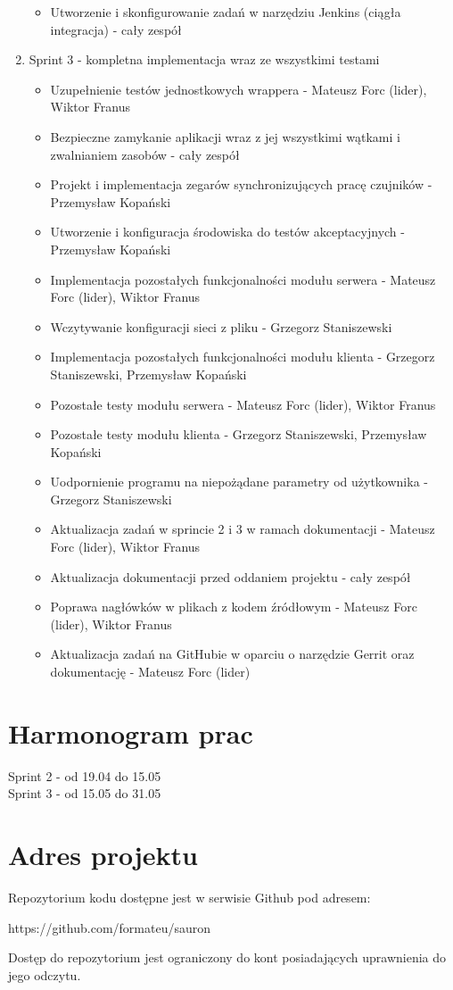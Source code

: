 \documentclass[a4paper,11pt]{article}
\begin{document}
\begin{enumerate}
\begin{itemize}
\item Utworzenie i skonfigurowanie zadań w narzędziu Jenkins (ciągła integracja) - cały zespół
\end{itemize}
\item Sprint 3 - kompletna implementacja wraz ze wszystkimi testami
\begin{itemize}
\item Uzupełnienie testów jednostkowych wrappera - Mateusz Forc (lider), Wiktor Franus
\item Bezpieczne zamykanie aplikacji wraz z jej wszystkimi wątkami i zwalnianiem zasobów - cały zespół
\item Projekt i implementacja zegarów synchronizujących pracę czujników - Przemysław Kopański
\item Utworzenie i konfiguracja środowiska do testów akceptacyjnych - Przemysław Kopański
\item Implementacja pozostałych funkcjonalności modułu serwera - Mateusz Forc (lider), Wiktor Franus
\item Wczytywanie konfiguracji sieci z pliku - Grzegorz Staniszewski
\item Implementacja pozostałych funkcjonalności modułu klienta
      - Grzegorz Staniszewski, Przemysław Kopański
\item Pozostałe testy modułu serwera - Mateusz Forc (lider), Wiktor Franus
\item Pozostałe testy modułu klienta - Grzegorz Staniszewski, Przemysław Kopański
\item Uodpornienie programu na niepożądane parametry od użytkownika
      - Grzegorz Staniszewski
\item Aktualizacja zadań w sprincie 2 i 3 w ramach dokumentacji - Mateusz Forc (lider), Wiktor Franus
\item Aktualizacja dokumentacji przed oddaniem projektu - cały zespół
\item Poprawa nagłówków w plikach z kodem źródłowym  - Mateusz Forc (lider), Wiktor Franus
\item Aktualizacja zadań na GitHubie w oparciu o narzędzie Gerrit oraz dokumentację - Mateusz Forc (lider)

\end{itemize}
\end{enumerate}

\section{Harmonogram prac}
Sprint 2 - od 19.04 do 15.05 \\
Sprint 3 - od 15.05 do 31.05 \\

\section{Adres projektu}
Repozytorium kodu dostępne jest w serwisie Github pod adresem:
\begin{center}https://github.com/formateu/sauron \end{center}
Dostęp do repozytorium jest ograniczony do kont posiadających uprawnienia do jego odczytu.
\end{document}
